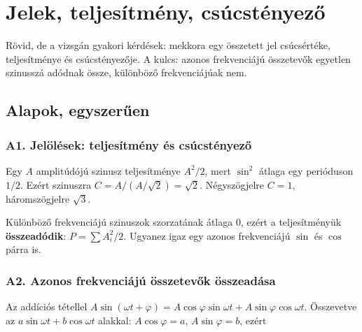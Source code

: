 \setcounter{chapter}{0}
\chapter{\texorpdfstring{Jelek, teljesítmény, csúcstényező}{Jelek, teljesítmény, csúcstényező}}\label{f1}
Rövid, de a vizsgán gyakori kérdések: mekkora egy összetett jel csúcsértéke, teljesítménye és csúcstényezője. A kulcs: azonos frekvenciájú összetevők egyetlen szinusszá adódnak össze, különböző frekvenciájúak nem.

\section{Alapok, egyszerűen}
\subsection{\texorpdfstring{A1. Jelölések: teljesítmény és csúcstényező}{A1. Jelölések: teljesítmény és csúcstényező}}\label{a1-teljesitmeny}
\par{}\par

Egy $A$ amplitúdójú szinusz teljesítménye $A^2/2$, mert $\sin^2$ átlaga egy perióduson $1/2$. Ezért szinuszra $C=A/(A/\sqrt2)=\sqrt2$. Négyszögjelre $C=1$, háromszögjelre $\sqrt3$.

Különböző frekvenciájú szinuszok szorzatának átlaga 0, ezért a teljesítményük \textbf{összeadódik}: $P=\sum A_i^2/2$. Ugyanez igaz egy azonos frekvenciájú $\sin$ és $\cos$ párra is.

\subsection{\texorpdfstring{A2. Azonos frekvenciájú összetevők összeadása}{A2. Azonos frekvenciájú összetevők összeadása}}\label{a1-fazor}
Az addíciós tétellel $A\sin(\omega t+\varphi)=A\cos\varphi\sin\omega t+A\sin\varphi\cos\omega t$. Összevetve az $a\sin\omega t+b\cos\omega t$ alakkal: $A\cos\varphi=a$, $A\sin\varphi=b$, ezért

